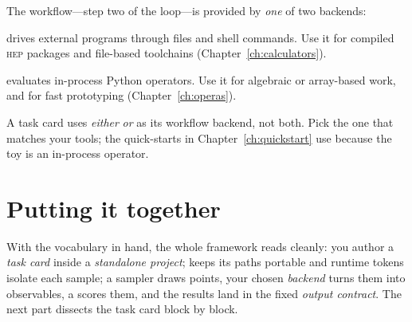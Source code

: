 The workflow---step two of the loop---is provided by \emph{one} of two backends:

\begin{description}[style=nextline, leftmargin=1.2em]
  \item[\yamlkey{Calculators}] drives external programs through files and shell commands. Use
        it for compiled \textsc{hep} packages and file-based toolchains
        (Chapter~\ref{ch:calculators}).
  \item[\yamlkey{Operas}] evaluates in-process Python operators. Use it for algebraic or
        array-based work, and for fast prototyping (Chapter~\ref{ch:operas}).
\end{description}

\begin{jwarn}
A task card uses \emph{either}  \emph{or}  as its workflow
backend, not both. Pick the one that matches your tools; the quick-starts in
Chapter~\ref{ch:quickstart} use  because the  toy is an in-process
operator.
\end{jwarn}

\section{Putting it together}
\label{sec:concepts-together}

With the vocabulary in hand, the whole framework reads cleanly: you author a \emph{task card}
inside a \emph{standalone project};  keeps its paths portable and runtime tokens
isolate each sample; a sampler draws points, your chosen \emph{backend} turns them into
observables, a  scores them, and the results land in the fixed
\emph{output contract}. The next part dissects the task card block by block.

